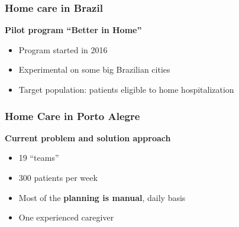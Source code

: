 \begin{frame}
   \frametitle{Home care in Brazil}

   \textbf{Pilot program ``Better in Home''}
   \begin{itemize}
      \item Program started in 2016
      \item Experimental on some big Brazilian cities
      \item Target population: patients eligible to home hospitalization
   \end{itemize}


\end{frame}

\begin{frame}
   \frametitle{Home Care in Porto Alegre}

   \textbf{Current problem and solution approach}
   \begin{itemize}
      \item 19 ``teams''
      \item 300 patients per week
      \item Most of the \textbf{planning is manual}, daily basis
      \item One experienced caregiver
   \end{itemize}


\end{frame}

